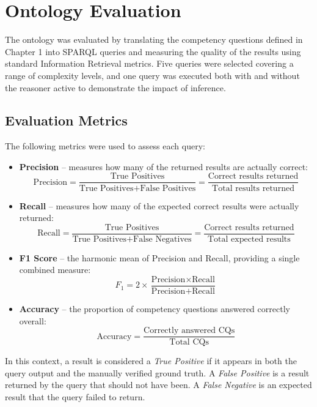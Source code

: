\chapter{Ontology Evaluation}

The ontology was evaluated by translating the competency questions defined in Chapter 1 into SPARQL queries and measuring the quality of the results using standard Information Retrieval metrics. Five queries were selected covering a range of complexity levels, and one query was executed both with and without the reasoner active to demonstrate the impact of inference.

\section*{Evaluation Metrics}

The following metrics were used to assess each query:

\begin{itemize}
    \item \textbf{Precision} -- measures how many of the returned results are actually correct:
    \[
    \text{Precision} = \frac{\text{True Positives}}{\text{True Positives} + \text{False Positives}} = \frac{\text{Correct results returned}}{\text{Total results returned}}
    \]

    \item \textbf{Recall} -- measures how many of the expected correct results were actually returned:
    \[
    \text{Recall} = \frac{\text{True Positives}}{\text{True Positives} + \text{False Negatives}} = \frac{\text{Correct results returned}}{\text{Total expected results}}
    \]

    \item \textbf{F1 Score} -- the harmonic mean of Precision and Recall, providing a single combined measure:
    \[
    F_1 = 2 \times \frac{\text{Precision} \times \text{Recall}}{\text{Precision} + \text{Recall}}
    \]

    \item \textbf{Accuracy} -- the proportion of competency questions answered correctly overall:
    \[
    \text{Accuracy} = \frac{\text{Correctly answered CQs}}{\text{Total CQs}}
    \]
\end{itemize}

\noindent In this context, a result is considered a \textit{True Positive} if it appears in both the query output and the manually verified ground truth. A \textit{False Positive} is a result returned by the query that should not have been. A \textit{False Negative} is an expected result that the query failed to return.

